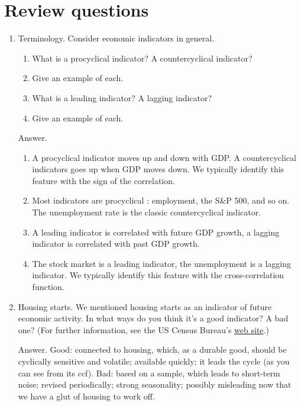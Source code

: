 \section*{Review questions}

\begin{enumerate}
\item Terminology. Consider economic indicators in general.
\begin{enumerate}
\item What is a procyclical indicator? A   countercyclical
 indicator?
\item Give an example of each.
\item What is a leading indicator?  A lagging indicator?
\item Give an example of each.
\end{enumerate}

Answer.
\begin{enumerate}
\item A procyclical indicator moves up and down with GDP.
A   countercyclical
 indicators goes up when GDP moves down.
We typically identify this feature with the sign of the correlation.
\item Most indicators are procyclical
:  employment, the S\&P 500, and so on.
The unemployment rate is the classic   countercyclical
 indicator.
\item A leading indicator is correlated with future GDP growth,
a lagging indicator is correlated with past GDP growth.
\item The stock market is a leading indicator,
the unemployment is a lagging indicator.
We typically identify this feature with the cross-correlation function.
\end{enumerate}


\item Housing starts.
We mentioned housing starts as an indicator
of future economic activity.
In what ways do you think it's a good indicator?  A bad one?
(For further information, see the US Census Bureau's
\href{http://www.census.gov/const/www/newresconstindex.html}
{web site}.)

Answer.  Good:  connected to housing, which, as a durable good,
should be cyclically sensitive and volatile; available quickly; it
leads the cycle (as you can see from its ccf). Bad: based on a sample,
which leads to short-term noise; revised periodically;
strong seasonality;
possibly misleading now that we have a glut of housing to work off.


\end{enumerate}
